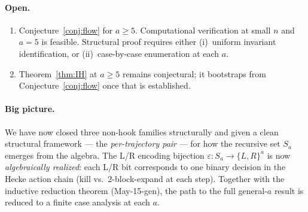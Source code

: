 \documentclass[11pt]{article}
\theoremstyle{definition}
\begin{document}
\paragraph{Open.}
\begin{enumerate}[leftmargin=2em,topsep=0.3em,itemsep=0.2em]
\item Conjecture~\ref{conj:flow} for $a\ge 5$.  Computational
verification at small $n$ and $a=5$ is feasible.  Structural proof
requires either (i)~uniform invariant identification, or
(ii)~case-by-case enumeration at each $a$.
\item Theorem~\ref{thm:IH} at $a\ge 5$ remains conjectural; it
bootstraps from Conjecture~\ref{conj:flow} once that is established.
\end{enumerate}

\paragraph{Big picture.}  We have now closed three non-hook families
structurally and given a clean structural framework — the
\emph{per-trajectory pair} — for how the recursive set $S_a$ emerges
from the algebra.  The L/R encoding bijection
$\varepsilon:S_a\to\{L,R\}^a$ is now \emph{algebraically realized}:
each L/R bit corresponds to one binary decision in the Hecke action
chain (kill vs.\ 2-block-expand at each step).  Together with the
inductive reduction theorem (May-15-gen), the path to the full
general-$a$ result is reduced to a finite case analysis at each $a$.
\end{document}
